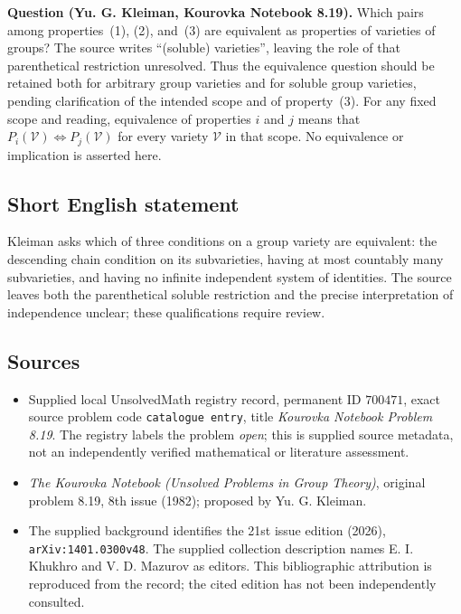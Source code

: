 \documentclass[11pt]{article}
\begin{document}
\textbf{Question (Yu. G. Kleiman, Kourovka Notebook 8.19).} Which pairs among properties~(1), (2), and~(3) are equivalent as properties of varieties of groups? The source writes ``(soluble) varieties'', leaving the role of that parenthetical restriction unresolved. Thus the equivalence question should be retained both for arbitrary group varieties and for soluble group varieties, pending clarification of the intended scope and of property~(3). For any fixed scope and reading, equivalence of properties \(i\) and \(j\) means that \(P_i(\mathcal V)\Longleftrightarrow P_j(\mathcal V)\) for every variety \(\mathcal V\) in that scope. No equivalence or implication is asserted here.
\subsection{Short English statement}
Kleiman asks which of three conditions on a group variety are equivalent: the descending chain condition on its subvarieties, having at most countably many subvarieties, and having no infinite independent system of identities. The source leaves both the parenthetical soluble restriction and the precise interpretation of independence unclear; these qualifications require review.
\subsection{Sources}
\begin{itemize}
\item Supplied local UnsolvedMath registry record, permanent ID \(700471\), exact source problem code \texttt{catalogue entry}, title \emph{Kourovka Notebook Problem 8.19}. The registry labels the problem \emph{open}; this is supplied source metadata, not an independently verified mathematical or literature assessment.
\item \emph{The Kourovka Notebook (Unsolved Problems in Group Theory)}, original problem 8.19, 8th issue (1982); proposed by Yu. G. Kleiman.
\item The supplied background identifies the 21st issue edition (2026), \texttt{arXiv:1401.0300v48}. The supplied collection description names E. I. Khukhro and V. D. Mazurov as editors. This bibliographic attribution is reproduced from the record; the cited edition has not been independently consulted.
\end{itemize}
\end{document}

